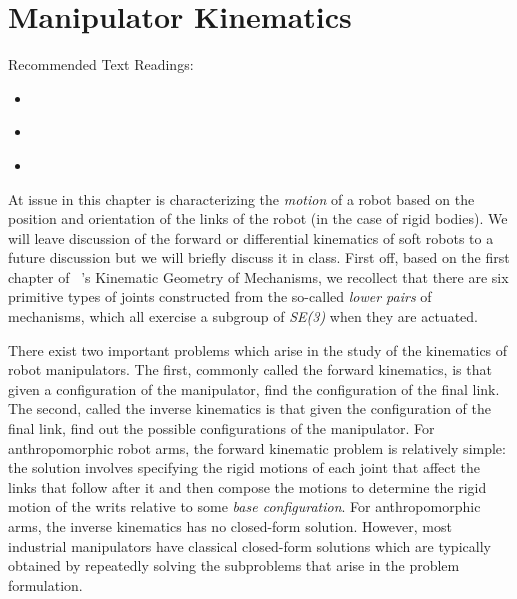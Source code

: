 \chapter{Manipulator Kinematics}  
\label{chap:manip}

 
Recommended Text Readings: 
\begin{itemize}
 \item \cite[Chapter 3]{MurrayBook}
 \item \cite{Brockett1990}
 \item \cite[Chapter 4]{LynchBook}
\end{itemize}

At issue in this chapter is characterizing the \textit{motion} of a robot based on the position and orientation of the links of the robot (in the case of rigid bodies). We will leave discussion of the forward or differential kinematics of soft robots to a future discussion but we will briefly discuss it in class. First off, based on the first chapter of ~\cite{Hunt1983}'s Kinematic Geometry of Mechanisms, we recollect that there are six primitive types of joints constructed from the so-called \textit{lower pairs} of mechanisms, which all exercise a subgroup of \textit{SE(3)} when they are actuated. 

There exist two important problems which arise in the study of the kinematics of robot manipulators. The first, commonly called the forward kinematics, is that given a configuration of the manipulator, find the configuration of the final link. The second, called the inverse kinematics is that given the configuration of the final link, find out the possible configurations of the manipulator. For anthropomorphic robot arms, the forward kinematic problem is relatively simple: the solution involves specifying the rigid motions of each joint that affect the links that follow after it and then compose the motions to determine the rigid motion of the writs relative to some \textit{base configuration}. For anthropomorphic arms, the inverse kinematics has no closed-form solution. However, most industrial manipulators have classical closed-form solutions which are typically obtained by repeatedly solving the subproblems that arise in the problem formulation.



